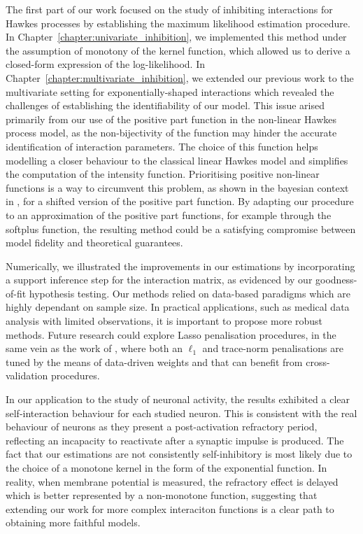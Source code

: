 The first part of our work focused on the study of inhibiting interactions for Hawkes processes by establishing the maximum likelihood estimation procedure.
In Chapter~\ref{chapter:univariate_inhibition}, we implemented this method under the assumption of monotony of the kernel function, which allowed us to derive a closed-form expression of the log-likelihood. 
In Chapter~\ref{chapter:multivariate_inhibition}, we extended our previous work to the multivariate setting for exponentially-shaped interactions which revealed the challenges of establishing the identifiability of our model.
This issue arised primarily from our use of the positive part function in the non-linear Hawkes process model, as the non-bijectivity of the function may hinder the accurate identification of interaction parameters.
The choice of this function helps modelling a closer behaviour to the classical linear Hawkes model and simplifies the computation of the intensity function.
Prioritising positive non-linear functions is a way to circumvent this problem, as shown in the bayesian context in \textcite{Sulem2024}, for a shifted version of the positive part function.
By adapting our procedure to an approximation of the positive part functions, for example through the softplus function, the resulting method could be a satisfying compromise between model fidelity and theoretical guarantees. 

Numerically, we illustrated the improvements in our estimations by incorporating a support inference step for the interaction matrix, as evidenced by our goodness-of-fit hypothesis testing.
Our methods relied on data-based paradigms which are highly dependant on sample size.
In practical applications, such as medical data analysis with limited observations, it is important to propose more robust methods. 
Future research could explore Lasso penalisation procedures, in the same vein as the work of \textcite{Bacry2020}, where both an $\ell_1$ and trace-norm penalisations are tuned by the means of data-driven weights and that can benefit from cross-validation procedures.

In our application to the study of neuronal activity, the results exhibited a clear self-interaction behaviour for each studied neuron.
This is consistent with the real behaviour of neurons as they present a post-activation refractory period, reflecting an incapacity to reactivate 
after a synaptic impulse is produced.
The fact that our estimations are not consistently self-inhibitory is most likely due to the choice of a monotone kernel in the form of the exponential function.
In reality, when membrane potential is measured, the refractory effect is delayed which is better represented by a non-monotone function, suggesting that extending our work for more complex interaciton functions is a clear path to obtaining more faithful models.

